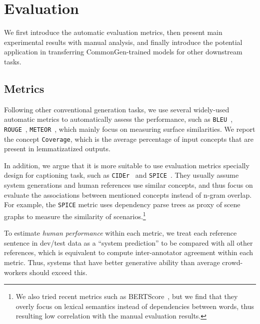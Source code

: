 \documentclass[11pt,a4paper]{article}
\begin{document}
 	

	\section{Evaluation}
	\label{sec:evaluation}

	We first introduce the automatic evaluation metrics, then present main experimental results with manual analysis, and finally introduce the potential application in transferring CommonGen-trained models for other downstream tasks.




	 	
	
	\subsection{Metrics}
    Following other conventional generation tasks, we use several widely-used automatic metrics to automatically assess the performance, such as \texttt{BLEU}~\cite{Papineni2001BleuAM}, \texttt{ROUGE}~\cite{Lin2004ROUGEAP},  \texttt{METEOR}~\cite{Banerjee2005METEORAA}, which mainly focus on measuring surface similarities.  We  report the concept \texttt{Coverage}, which is the average percentage of input concepts that are present in lemmatizatized outputs.
    
    In addition, we argue that it is more suitable to use evaluation metrics specially design for captioning task, such as \texttt{CIDEr}~\cite{Vedantam2014CIDErCI} and \texttt{SPICE}~\cite{Anderson2016SPICESP}.
    They usually assume system generations and human references use similar concepts, and thus focus on evaluate the associations between mentioned concepts instead of n-gram overlap.
    For example, the \texttt{SPICE} metric uses dependency parse trees as proxy of scene graphs to measure the similarity of scenarios.\footnote{We also tried recent metrics such as BERTScore~\cite{Zhang2020BERTScore}, but we find that they 
    overly focus on lexical semantics instead of dependencies between words, thus resulting low correlation with the manual evaluation results.}
    
    


    




	
	To estimate \textit{human performance} within each metric, we treat each reference sentence in dev/test data as a ``system prediction''  to be compared with all other references, which is equivalent to compute inter-annotator agreement within each metric. 
	Thus, systems that have better generative ability than average crowd-workers should exceed this.
	
\end{document}
